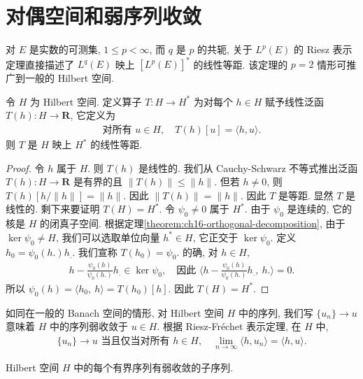 \documentclass[../../main.tex]{subfiles}
\begin{document}
\section{对偶空间和弱序列收敛}\label{section:ch16-dual-weak}

对 $E$ 是实数的可测集, $1\leqslant p<\infty$, 而 $q$ 是 $p$ 的共轭, 关于 $L^{p}(E)$ 的 Riesz 表示定理直接描述了 $L^{q}(E)$ 映上 $[L^{p}(E)]^{*}$ 的线性等距. 该定理的 $p=2$ 情形可推广到一般的 Hilbert 空间.

\begin{theorem}\label{theorem:ch16-riesz-frechet}
令 $H$ 为 Hilbert 空间. 定义算子 $T:H\to H^{*}$ 为对每个 $h\in H$ 赋予线性泛函 $T(h):H\to\mathbf{R}$, 它定义为
\begin{align}
\text{对所有 }u\in H,\quad T(h)[u]=\langle h,u\rangle.\label{align:ch16-riesz-1}
\end{align}
则 $T$ 是 $H$ 映上 $H^{*}$ 的线性等距.
\end{theorem}

\begin{proof}
令 $h$ 属于 $H$. 则 $T(h)$ 是线性的. 我们从 Cauchy-Schwarz 不等式推出泛函 $T(h):H\to\mathbf{R}$ 是有界的且 $\|T(h)\|\leqslant\|h\|$. 但若 $h\neq 0$, 则 $T(h)[h/\|h\|]=\|h\|$. 因此 $\|T(h)\|=\|h\|$. 因此 $T$ 是等距. 显然 $T$ 是线性的. 剩下来要证明 $T(H)=H^{*}$. 令 $\psi_{0}\neq 0$ 属于 $H^{*}$. 由于 $\psi_{0}$ 是连续的, 它的核是 $H$ 的闭真子空间. 根据定理\cref{theorem:ch16-orthogonal-decomposition}, 由于 $\ker\psi_{0}\neq H$, 我们可以选取单位向量 $h^{*}\in H$, 它正交于 $\ker\psi_{0}$. 定义 $h_{0}=\psi_{0}(h.)h_{.}$. 我们宣称 $T(h_{0})=\psi_{0}$. 的确, 对 $h\in H$,
\begin{align*}
h-\frac{\psi_{0}(h)}{\psi_{0}(h.)}h_{.}\in\ker\psi_{0},\quad\text{因此 }\langle h-\frac{\psi_{0}(h)}{\psi_{0}(h.)}h_{.},\ h.\rangle=0.
\end{align*}
所以 $\psi_{0}(h)=\langle h_{0},\ h\rangle=T(h_{0})[h]$. 因此 $T(H)=H^{*}$.
\end{proof}

如同在一般的 Banach 空间的情形, 对 Hilbert 空间 $H$ 中的序列, 我们写 $\{u_{n}\}\to u$ 意味着 $H$ 中的序列弱收敛于 $u\in H$. 根据 Riesz-Fr\'echet 表示定理, 在 $H$ 中,
\begin{align*}
\{u_{n}\}\to u\text{ 当且仅当对所有 }h\in H,\quad\lim_{n\to\infty}\langle h,u_{n}\rangle=\langle h,u\rangle.
\end{align*}

\begin{theorem}\label{theorem:ch16-weak-seq}
Hilbert 空间 $H$ 中的每个有界序列有弱收敛的子序列.
\end{theorem}
\end{document}
